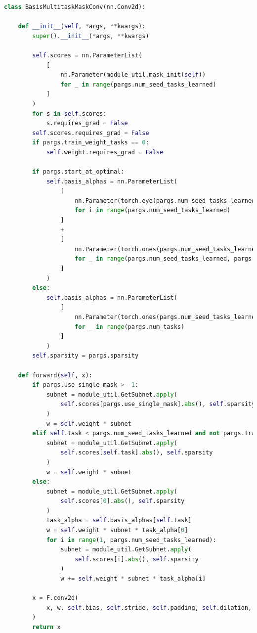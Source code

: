 \documentclass{article}
\begin{document}
\begin{lstlisting}[language=Python, caption=Linear Combination Approach Pseudocode]
class BasisMultitaskMaskConv(nn.Conv2d):

    def __init__(self, *args, **kwargs):
        super().__init__(*args, **kwargs)

        self.scores = nn.ParameterList(
            [
                nn.Parameter(module_util.mask_init(self))
                for _ in range(pargs.num_seed_tasks_learned)
            ]
        )
        for s in self.scores:
            s.requires_grad = False
        self.scores.requires_grad = False
        if pargs.train_weight_tasks == 0:
            self.weight.requires_grad = False

        if pargs.start_at_optimal:
            self.basis_alphas = nn.ParameterList(
                [
                    nn.Parameter(torch.eye(pargs.num_seed_tasks_learned)[i])
                    for i in range(pargs.num_seed_tasks_learned)
                ]
                +
                [
                    nn.Parameter(torch.ones(pargs.num_seed_tasks_learned)/pargs.num_seed_tasks_learned)
                    for _ in range(pargs.num_seed_tasks_learned, pargs.num_tasks)
                ]
            )
        else:
            self.basis_alphas = nn.ParameterList(
                [
                    nn.Parameter(torch.ones(pargs.num_seed_tasks_learned)/pargs.num_seed_tasks_learned)
                    for _ in range(pargs.num_tasks)
                ]
            )
        self.sparsity = pargs.sparsity

    def forward(self, x):
        if pargs.use_single_mask > -1:
            subnet = module_util.GetSubnet.apply(
                self.scores[pargs.use_single_mask].abs(), self.sparsity
            )
            w = self.weight * subnet
        elif self.task < pargs.num_seed_tasks_learned and not pargs.train_mask_alphas:
            subnet = module_util.GetSubnet.apply(
                self.scores[self.task].abs(), self.sparsity
            )
            w = self.weight * subnet
        else:
            subnet = module_util.GetSubnet.apply(
                self.scores[0].abs(), self.sparsity
            )
            task_alpha = self.basis_alphas[self.task]
            w = self.weight * subnet * task_alpha[0]
            for i in range(1, pargs.num_seed_tasks_learned):
                subnet = module_util.GetSubnet.apply(
                    self.scores[i].abs(), self.sparsity
                )
                w += self.weight * subnet * task_alpha[i]

        x = F.conv2d(
            x, w, self.bias, self.stride, self.padding, self.dilation, self.groups
        )
        return x
\end{lstlisting}
\end{document}
